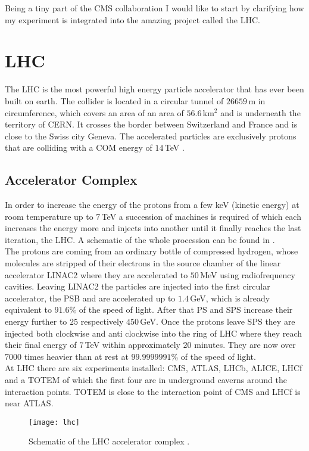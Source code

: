 
Being a tiny part of the \ac{CMS} collaboration I would like to start by clarifying how my experiment is integrated into the amazing project called the \ac{LHC}.
\section{\ac{LHC}}
The LHC is the most powerful high energy particle accelerator that has ever been built on earth. The collider is located in a circular tunnel of $26659\,$m in circumference, which covers an area of an area of $56.6\,$km$^{2}$ and is underneath the territory of \ac{CERN}. It crosses the border between Switzerland and France and is close to the Swiss city Geneva. The accelerated particles are exclusively protons that are colliding with a \ac{COM} energy of $14\,$TeV \cite{lhc}.
\subsection*{Accelerator Complex}
In order to increase the energy of the protons from a few keV (kinetic energy) at room temperature up to $7\,$TeV a succession of machines is required of which each increases the energy more and injects into another until it finally reaches the last iteration, the \ac{LHC}. A schematic of the whole procession can be found in .\\
The protons are coming from an ordinary bottle of compressed hydrogen, whose molecules are stripped of their electrons in the source chamber of the linear accelerator LINAC2 where they are accelerated to $50\,$MeV using radiofrequency cavities. Leaving LINAC2 the particles are injected into the first circular accelerator, the \ac{PSB} and are accelerated up to $1.4\,$GeV, which is already equivalent to $91.6\%$ of the speed of light. After that \ac{PS} and \ac{SPS} increase their energy further to $25$ respectively $450\,$GeV. Once the protons leave \ac{SPS} they are injected both clockwise and anti clockwise into the ring of \ac{LHC} where they reach their final energy of $7\,$TeV within approximately $20$ minutes. They are now over $7000$ times heavier than at rest at $99.9999991\%$ of the speed of light.\\
At \ac{LHC} there are six experiments installed: \ac{CMS}, \ac{ATLAS}, \ac{LHCb}, \ac{ALICE}, \ac{LHCf} and a \ac{TOTEM} of which the first four are in underground caverns around the interaction points. \ac{TOTEM} is close to the interaction point of \ac{CMS} and \ac{LHCf} is near \ac{ATLAS}.
\begin{figure}[ht]
	\texttt{[image: lhc]}
	\caption{Schematic of the \ac{LHC} accelerator complex \cite{lhc}.}
	\label{p18}
\end{figure}
